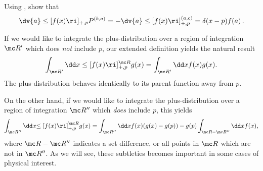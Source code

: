 

\begin{exercise}
    \label{ex:plus-fn-dervivative}
    Using , show that
    \begin{align}
        \label{eq:plus-fn-derivative}
        \dv{a} \le[f(x)\ri]_{+,p}P^{(b,a)}
        =
        -
        \dv{a} \le[f(x)\ri]_{+,p}^{(a,c)}
        =
        \delta(x-p) f(a)
        \,.
    \end{align}
\end{exercise}


\begin{example}{}
    If we would like to integrate the plus-distribution over a region of integration \(\mc R'\) which does \textit{not} include \(p\), our extended definition yields the natural result
    \begin{equation}
        \int_{\mc R'} \dd x\le[f(x)\ri]_{+,p}^{\mc R} g(x)
        =
        \int_{\mc R'} \dd x f(x) g(x)
        .
    \end{equation}
    The plus-distribution behaves identically to its parent function away from \(p\).

    On the other hand, if we would like to integrate the plus-distribution over a region of integration \(\mc R''\) which \textit{does} include \(p\), this yields
    \begin{equation}
        \int_{\mc R''} \dd x{\le[f(x)\ri]}_{+,p}^{\mc R} g(x)
        =
        \int_{\mc R''} \dd x f(x) (g(x) - g(p))
        -
        g(p) \int_{\mc R - \mc R''} \dd x f(x)
        ,
    \end{equation}
    where \(\mc R - \mc R''\) indicates a set difference, or all points in \(\mc R\) which are not in \(\mc R''\).
    As we will see, these subtleties becomes important in some cases of physical interest.
\end{example}

